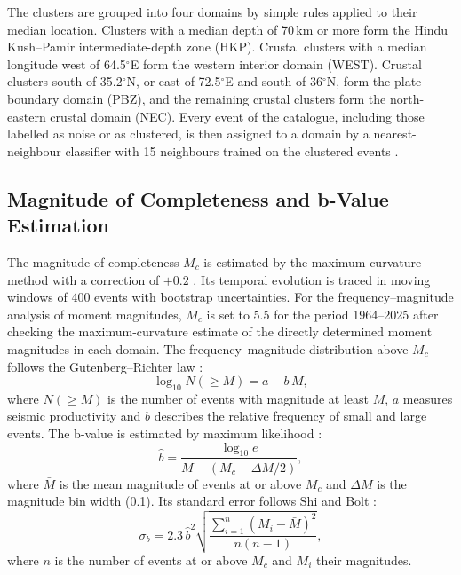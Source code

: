 \documentclass[11pt]{article}
\begin{document}
The clusters are grouped into four domains by simple rules applied to their median
location. Clusters with a median depth of 70\,km or more form
the Hindu Kush--Pamir intermediate-depth zone (HKP). Crustal clusters with a median
longitude west of 64.5$^\circ$E form the western interior domain (WEST). Crustal
clusters south of 35.2$^\circ$N, or east of 72.5$^\circ$E and south of 36$^\circ$N,
form the plate-boundary domain (PBZ), and the remaining crustal clusters form the
north-eastern crustal domain (NEC). Every event of the catalogue, including those
labelled as noise or as clustered, is then assigned to a domain by a
nearest-neighbour classifier with 15 neighbours trained on the clustered events
\cite{Pedregosa2011}.


\subsection{Magnitude of Completeness and b-Value Estimation}
The magnitude of completeness $M_c$ is estimated by the maximum-curvature method with
a correction of $+0.2$ \cite{Wiemer2000, Woessner2005}. Its temporal evolution is
traced in moving windows of 400 events with bootstrap uncertainties. For the
frequency--magnitude analysis of moment magnitudes, $M_c$ is set to 5.5 for the
period 1964--2025 after checking the maximum-curvature estimate of the directly
determined moment magnitudes in each domain. The frequency--magnitude distribution
above $M_c$ follows the Gutenberg--Richter law \cite{Gutenberg1944}:
\begin{equation}
  \log_{10} N(\geq M) = a - b\,M, \label{eq:gr}
\end{equation}
where $N(\geq M)$ is the number of events with magnitude at least $M$, $a$ measures
seismic productivity and $b$ describes the relative frequency of small and large
events. The b-value is estimated by maximum likelihood \cite{Aki1965}:
\begin{equation}
  \hat{b} = \frac{\log_{10} e}{\bar{M} - \left(M_c - \Delta M/2\right)},
  \label{eq:aki}
\end{equation}
where $\bar{M}$ is the mean magnitude of events at or above $M_c$ and $\Delta M$ is
the magnitude bin width (0.1). Its standard error follows Shi and Bolt
\cite{Shi1982}:
\begin{equation}
  \sigma_b = 2.3\,\hat{b}^{2}\sqrt{\frac{\sum_{i=1}^{n}(M_i-\bar{M})^2}{n(n-1)}},
  \label{eq:shibolt}
\end{equation}
where $n$ is the number of events at or above $M_c$ and $M_i$ their magnitudes.
\end{document}
